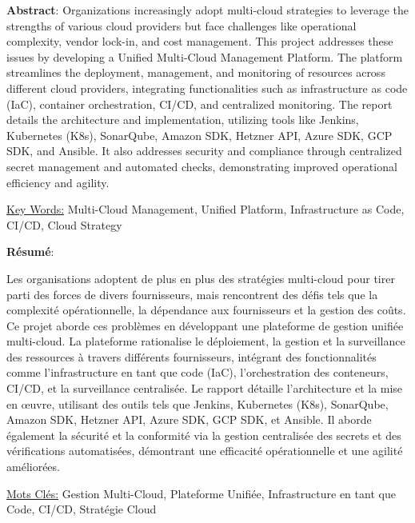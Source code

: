 \textbf {Abstract}:
Organizations increasingly adopt multi-cloud strategies to leverage the strengths of various cloud providers but face challenges like operational complexity, vendor lock-in, and cost management. This project addresses these issues by developing a Unified Multi-Cloud Management Platform. The platform streamlines the deployment, management, and monitoring of resources across different cloud providers, integrating functionalities such as infrastructure as code (IaC), container orchestration, CI/CD, and centralized monitoring. The report details the architecture and implementation, utilizing tools like Jenkins, Kubernetes (K8s), SonarQube, Amazon SDK, Hetzner API, Azure SDK, GCP SDK, and Ansible. It also addresses security and compliance through centralized secret management and automated checks, demonstrating improved operational efficiency and agility.

\underline{Key Words:} Multi-Cloud Management, Unified Platform, Infrastructure as Code, CI/CD, Cloud Strategy

\vspace*{6cm}
\textbf {Résumé}:

Les organisations adoptent de plus en plus des stratégies multi-cloud pour tirer parti des forces de divers fournisseurs, mais rencontrent des défis tels que la complexité opérationnelle, la dépendance aux fournisseurs et la gestion des coûts. Ce projet aborde ces problèmes en développant une plateforme de gestion unifiée multi-cloud. La plateforme rationalise le déploiement, la gestion et la surveillance des ressources à travers différents fournisseurs, intégrant des fonctionnalités comme l'infrastructure en tant que code (IaC), l'orchestration des conteneurs, CI/CD, et la surveillance centralisée. Le rapport détaille l'architecture et la mise en œuvre, utilisant des outils tels que Jenkins, Kubernetes (K8s), SonarQube, Amazon SDK, Hetzner API, Azure SDK, GCP SDK, et Ansible. Il aborde également la sécurité et la conformité via la gestion centralisée des secrets et des vérifications automatisées, démontrant une efficacité opérationnelle et une agilité améliorées.

\underline{Mots Clés:} Gestion Multi-Cloud, Plateforme Unifiée, Infrastructure en tant que Code, CI/CD, Stratégie Cloud